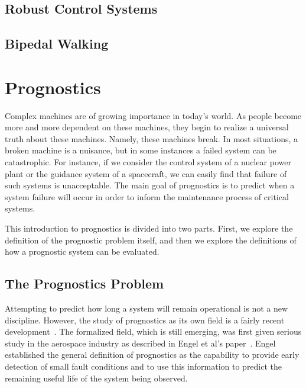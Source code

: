 \documentclass[12pt]{article}
\begin{document}
\subsection{Robust Control Systems}
\subsection{Bipedal Walking}


\section{Prognostics}
Complex machines are of growing importance in today's world.  As people
become more and more dependent on these machines, they begin to realize a
universal truth about these machines.  Namely, these machines break.  In most
situations, a broken machine is a nuisance, but in some instances a failed
system can be catastrophic.  For instance, if we consider the control system of
a nuclear power plant or the guidance system of a spacecraft, we can easily
find that failure of such systems is unacceptable.  The main goal of
prognostics is to predict when a system failure will occur in order to inform
the maintenance process of critical systems.

This introduction to prognostics is divided into two parts.  First, we explore
the definition of the prognostic problem itself, and then we explore the
definitions of how a prognostic system can be evaluated.

\subsection{The Prognostics Problem}
Attempting to predict how long a system will remain operational is
not a new discipline.  However, the study of prognostics as its own field is a
fairly recent development~\cite{877920}.  The formalized field, which is still
emerging, was first given serious study in the aerospace industry as described
in Engel et al's paper~\cite{877920}.  Engel established the general
definition of prognostics as the capability to provide early detection of small
fault conditions and to use this information to predict the remaining useful
life of the system being observed.  
\end{document}
